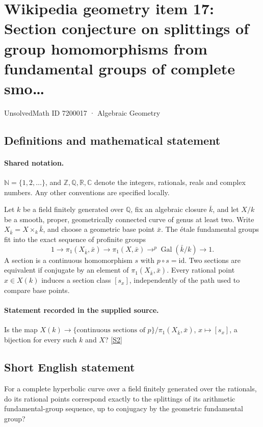 \documentclass[11pt]{article}
\newcommand{\sref}[2]{\hyperlink{source:#1:#2}{[S#2]}}
\begin{document}
\setcounter{section}{7200016}
\section{Wikipedia geometry item 17: Section conjecture on splittings of group homomorphisms from fundamental groups of complete smo…}\label{7200017}
{\small\sffamily UnsolvedMath ID 7200017 · Algebraic Geometry}
\subsection{Definitions and mathematical statement}

\paragraph{Shared notation.}$\mathbb N=\{1,2,\ldots\}$, and $\mathbb Z,\mathbb Q,\mathbb R,\mathbb C$ denote the integers, rationals, reals and complex numbers. Any other conventions are specified locally.


Let $k$ be a field finitely generated over $\mathbb Q$, fix an algebraic closure $\bar k$, and let $X/k$ be a smooth, proper, geometrically connected curve of genus at least two. Write $X_{\bar k}=X\times_k\bar k$, and choose a geometric base point $\bar x$. The étale fundamental groups fit into the exact sequence of profinite groups
\[1\longrightarrow\pi_1(X_{\bar k},\bar x)\longrightarrow\pi_1(X,\bar x)\mathrel{\mathop{\longrightarrow}^{p}}\operatorname{Gal}(\bar k/k)\longrightarrow1.\]
A section is a continuous homomorphism $s$ with $p\circ s=\mathrm{id}$. Two sections are equivalent if conjugate by an element of $\pi_1(X_{\bar k},\bar x)$. Every rational point $x\in X(k)$ induces a section class $[s_x]$, independently of the path used to compare base points.
\paragraph{Statement recorded in the supplied source.}
Is the map $X(k)\longrightarrow\{\text{continuous sections of }p\}/\pi_1(X_{\bar k},\bar x)$, $x\longmapsto[s_x]$, a bijection for every such $k$ and $X$? \sref{7200017}{2}
\subsection{Short English statement}
For a complete hyperbolic curve over a field finitely generated over the rationals, do its rational points correspond exactly to the splittings of its arithmetic fundamental-group sequence, up to conjugacy by the geometric fundamental group?
\end{document}
